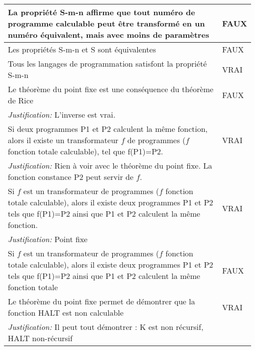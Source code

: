 \begin{longtable}{p{13cm}|l}
    La propriété S-m-n affirme que tout numéro de programme calculable peut être transformé en un numéro équivalent, mais avec moins de paramètres & FAUX \\
     \hline
    
    Les propriétés S-m-n et S sont équivalentes & FAUX \\
     \hline
    
    Tous les langages de programmation satisfont la propriété S-m-n & VRAI \\
     \hline
     
     Le théorème du point fixe est une conséquence du théorème de Rice & FAUX\\
     \textit{Justification:} L'inverse est vrai. & \\
     \hline
     Si deux programmes P1 et P2 calculent la même fonction, alors il existe un transformateur $f$ de programmes ($f$ fonction totale calculable), tel que f(P1)=P2. & VRAI \\
     \textit{Justification:} Rien à voir avec le théorème du point fixe. La fonction constance P2 peut servir de $f$. & \\
     \hline
     
     Si $f$ est un transformateur de programmes ($f$ fonction totale calculable), alors il existe deux programmes P1 et P2 tels que f(P1)=P2 ainsi que P1 et P2 calculent la même fonction. & VRAI \\
     \textit{Justification:} Point fixe & \\
     \hline
     
     Si $f$ est un transformateur de programmes ($f$ fonction totale calculable), alors il existe deux programmes P1 et P2 tels que f(P1)=P2 ainsi que P1 et P2 calculent la même fonction totale & FAUX \\
     \hline
     
     Le théorème du point fixe permet de démontrer que la fonction HALT est non calculable & VRAI \\
     \textit{Justification:} Il peut tout démontrer : K est non récursif, HALT non-récursif & \\
     \hline
     

\end{longtable}
